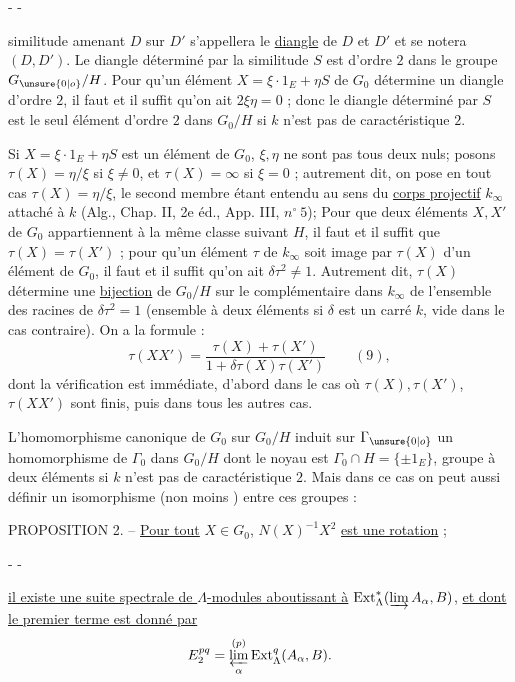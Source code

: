 -  -

similitude amenant $D$ sur $D'$ s'appellera le \uline{diangle} de $D$ et $D'$ et se notera $(D,D')$. Le diangle déterminé par la similitude $S$ est d'ordre $2$ dans le groupe $G_{\unsure{0|o}}/H$. Pour qu'un élément $X=\xi\cdot1_E+\eta S$ de $G_0$ détermine un diangle d'ordre $2$, il faut et il suffit qu'on ait $2\xi\eta=0$ ; donc le diangle déterminé par $S$ est le seul élément d'ordre $2$ dans $G_0/H$ si $k$ n'est pas de caractéristique $2$.

Si $X=\xi\cdot1_E+\eta S$ est un élément de $G_0$, $\xi,\eta$ ne sont pas tous deux nuls; posons $\tau(X)=\eta/\xi$ si $\xi\ne0$, et $\tau(X)=\infty$ si $\xi=0$ ; autrement dit, on pose en tout cas $\tau(X)=\eta/\xi$, le second membre étant entendu au sens du \uline{corps projectif} $k_\infty$ attaché à $k$ (Alg., Chap. II, 2e éd., App. III, $n^\circ\ 5$); Pour que deux éléments $X,X'$ de $G_0$ appartiennent à la même classe suivant $H$, il faut et il suffit que $\tau(X)=\tau(X')$ ; pour qu'un élément $\tau$ de $k_\infty$ soit image par $\tau(X)$ d'un élément de $G_0$, il faut et il suffit qu'on ait $\delta\tau^2\ne1$. Autrement dit, $\tau(X)$ détermine une \uline{bijection} de $G_0/H$ sur le complémentaire dans $k_\infty$ de l'ensemble des racines de $\delta\tau^2=1$ (ensemble à deux éléments si $\delta$ est un carré  $k$, vide dans le cas contraire). On a la formule :
\[
\tau(XX')=\frac{\tau(X)+\tau(X')}{1+\delta\tau(X)\tau(X')}\qquad(9),
\]
dont la vérification est immédiate, d'abord dans le cas où $\tau(X),\tau(X')$, $\tau(XX')$ sont finis, puis dans tous les autres cas.

L'homomorphisme canonique de $G_0$ sur $G_0/H$ induit sur $\Gamma_{\unsure{0|o}}$ un homomorphisme de $\Gamma_0$ dans $G_0/H$ dont le noyau est $\Gamma_0\cap H=\{\pm1_E\}$, groupe à deux éléments si $k$ n'est pas de caractéristique $2$. Mais dans ce cas on peut aussi définir un isomorphisme (non moins ) entre ces groupes :

PROPOSITION 2. -- \uline{Pour tout} $X\in G_0$, $N(X)^{-1}X^2$ \uline{est une rotation} ;

-  -

\uline{il existe une suite spectrale de $\Lambda$-modules aboutissant à}
$\operatorname{Ext}_{\Lambda}^{*}(\varinjlim A_{\alpha},B)$, \uline{et dont le premier terme est donné par}
\[
E_2^{pq}=\varprojlim_{\alpha}^{(p)}\operatorname{Ext}_{\Lambda}^{q}(A_{\alpha},B).
\]

